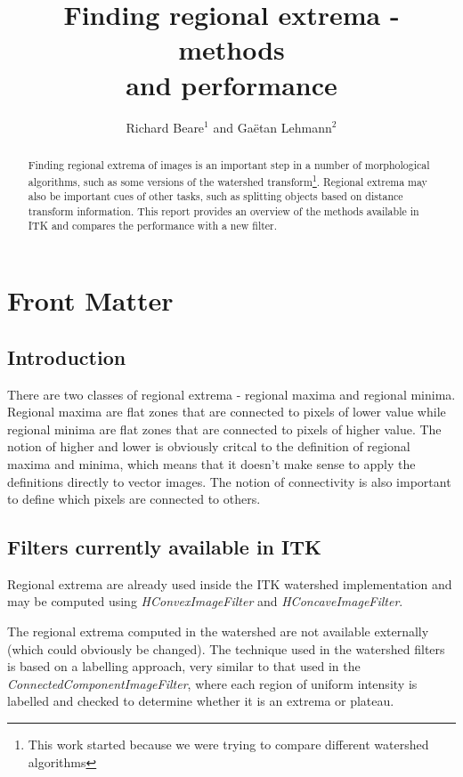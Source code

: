 \documentclass{InsightArticle}
\title{Finding regional extrema - methods\\ and performance}
\author{Richard Beare{$^1$} {\small{and}} Ga\"etan Lehmann{$^2$}}
\begin{document}
\maketitle

\ifhtml
\chapter*{Front Matter\label{front}}
\fi

\begin{abstract}
\noindent
Finding regional extrema of images is an important step in a number of
morphological algorithms, such as some versions of the watershed
transform\footnote{This work started because we were trying to compare
different watershed algorithms}. Regional extrema may also be
important cues of other tasks, such as splitting objects based on
distance transform information. This report provides an overview of
the methods available in ITK and compares the performance with a new
filter.

\end{abstract}


\section{Introduction}
There are two classes of regional extrema - regional maxima and
regional minima. Regional maxima are flat zones that are connected to
pixels of lower value while regional minima are flat zones that are
connected to pixels of higher value. The notion of higher and lower is
obviously critcal to the definition of regional maxima and minima,
which means that it doesn't make sense to apply the definitions
directly to vector images. The notion of connectivity is also important
to define which pixels are connected to others.

\section{Filters currently available in ITK}
Regional extrema are already used inside the ITK watershed
implementation and may be computed using {\em HConvexImageFilter}
and {\em HConcaveImageFilter}. 

The regional extrema computed in the watershed are not available
externally (which could obviously be changed). The technique used in
the watershed filters is based on a labelling approach, very similar
to that used in the {\em ConnectedComponentImageFilter}, where each
region of uniform intensity is labelled and checked to determine
whether it is an extrema or plateau.
\end{document}
